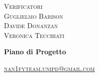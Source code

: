 \documentclass[8pt]{article}
\begin{document}
\begin{titlepage}
\begin{minipage}[t]{0.47\textwidth}
		{\large{\textsc{Verificatori}}
			\vspace{3mm}
			{\\\large{\textsc{Guglielmo Barison}\\}}
			{\large{\textsc{Davide Donanzan}\\}}
      {\large{\textsc{Veronica Tecchiati}\\}}
		}
		\vspace{4mm}\vspace{4mm}
	\end{minipage}
	\vspace{4cm}
	\begin{center}
		\begin{flushright}
			{\fontsize{30pt}{52pt}\selectfont \textbf{Piano di Progetto\\}} %
		\end{flushright}
		\vspace{3cm}
	\end{center}
	\vspace{7.5cm}
	{\small \textsc{\href{mailto: nan1fyteam.unipd@gmail.com}{\color{black}nan1fyteam.unipd@gmail.com}}}
\end{titlepage}
\pagestyle{mystyle}
\end{document}
